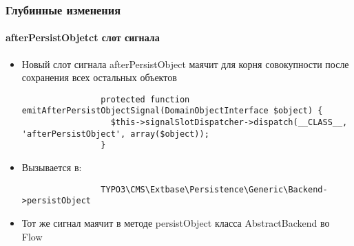 \begin{frame}[fragile]
	\frametitle{Глубинные изменения}
	\framesubtitle{afterPersistObjetct слот сигнала}

	\lstset{
		basicstyle=\tiny\ttfamily
	}

	\begin{itemize}

		\item Новый слот сигнала afterPersistObject маячит для корня совокупности после сохранения всех остальных объектов

			\begin{lstlisting}
				protected function emitAfterPersistObjectSignal(DomainObjectInterface $object) {
				  $this->signalSlotDispatcher->dispatch(__CLASS__, 'afterPersistObject', array($object));
				}
			\end{lstlisting}

		\item Вызывается в:

			\begin{lstlisting}
				TYPO3\CMS\Extbase\Persistence\Generic\Backend->persistObject
			\end{lstlisting}

		\item Тот же сигнал маячит в методе persistObject класса AbstractBackend во Flow

	\end{itemize}

\end{frame}                                                 


